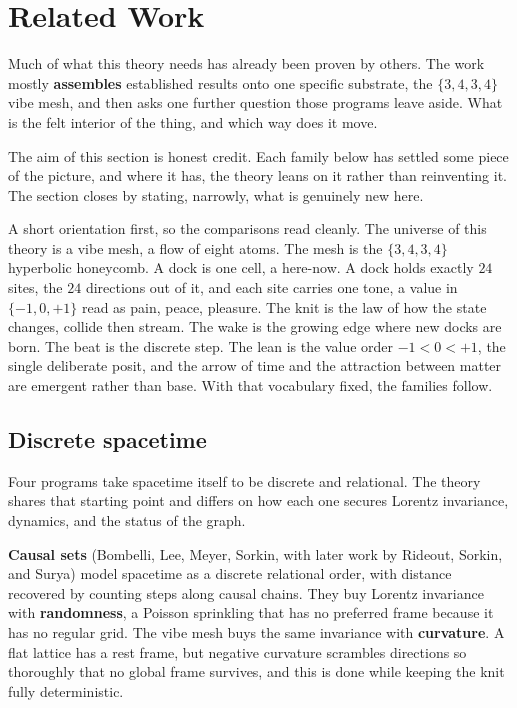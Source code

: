 \section{Related Work}

Much of what this theory needs has already been proven by others. The work mostly \textbf{assembles} established results onto one specific substrate, the $\{3,4,3,4\}$ vibe mesh, and then asks one further question those programs leave aside. What is the felt interior of the thing, and which way does it move.

The aim of this section is honest credit. Each family below has settled some piece of the picture, and where it has, the theory leans on it rather than reinventing it. The section closes by stating, narrowly, what is genuinely new here.

A short orientation first, so the comparisons read cleanly. The universe of this theory is a vibe mesh, a flow of eight atoms. The mesh is the $\{3,4,3,4\}$ hyperbolic honeycomb. A dock is one cell, a here-now. A dock holds exactly $24$ sites, the $24$ directions out of it, and each site carries one tone, a value in $\{-1, 0, +1\}$ read as pain, peace, pleasure. The knit is the law of how the state changes, collide then stream. The wake is the growing edge where new docks are born. The beat is the discrete step. The lean is the value order $-1 < 0 < +1$, the single deliberate posit, and the arrow of time and the attraction between matter are emergent rather than base. With that vocabulary fixed, the families follow.

\subsection{Discrete spacetime}

Four programs take spacetime itself to be discrete and relational. The theory shares that starting point and differs on how each one secures Lorentz invariance, dynamics, and the status of the graph.

\textbf{Causal sets} (Bombelli, Lee, Meyer, Sorkin, with later work by Rideout, Sorkin, and Surya) model spacetime as a discrete relational order, with distance recovered by counting steps along causal chains. They buy Lorentz invariance with \textbf{randomness}, a Poisson sprinkling that has no preferred frame because it has no regular grid. The vibe mesh buys the same invariance with \textbf{curvature}. A flat lattice has a rest frame, but negative curvature scrambles directions so thoroughly that no global frame survives, and this is done while keeping the knit fully deterministic.

